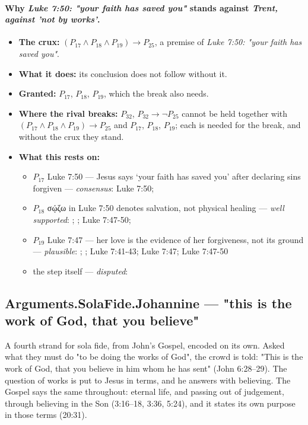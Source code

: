\documentclass[11pt]{article}
\begin{document}
\paragraph{Why \emph{Luke 7:50: "your faith has saved you"} stands against \emph{Trent, against 'not by works'}.}
\begin{itemize}
\item \textbf{The crux:} \((P_{17} \land P_{18} \land P_{19}) \rightarrow P_{25}\), a premise of \emph{Luke 7:50: "your faith has saved you"}.
\item \textbf{What it does:} its conclusion does not follow without it.
\item \textbf{Granted:} \(P_{17}\), \(P_{18}\), \(P_{19}\), which the break also needs.
\item \textbf{Where the rival breaks:} \(P_{32}\), \(P_{32} \rightarrow \lnot P_{25}\) cannot be held together with \((P_{17} \land P_{18} \land P_{19}) \rightarrow P_{25}\) and \(P_{17}\), \(P_{18}\), \(P_{19}\); each is needed for the break, and without the crux they stand.
\item \textbf{What this rests on:}
\begin{itemize}
\item \(P_{17}\) Luke 7:50 — Jesus says ‘your faith has saved you’ after declaring sins forgiven --- \emph{consensus}: Luke 7:50; \cite[ad loc. Luke 7:50]{marshall-luke-1978}
\item \(P_{18}\) σῴζω in Luke 7:50 denotes salvation, not physical healing --- \emph{well supported}: \cite[Apology IV, on love and the fulfilling of the law: Luke 7:47–50]{kolb-wengert-book-of-concord-2000}; \cite[54--55]{padilla-narrative-criticism-2021}; Luke 7:47-50; \cite[ad loc. Luke 7:50]{marshall-luke-1978}
\item \(P_{19}\) Luke 7:47 — her love is the evidence of her forgiveness, not its ground --- \emph{plausible}: \cite[54--54]{padilla-narrative-criticism-2021}; \cite[Apology IV, on love and the fulfilling of the law: Luke 7:47–50]{kolb-wengert-book-of-concord-2000}; Luke 7:41-43; Luke 7:47; Luke 7:47-50
\item the step itself --- \emph{disputed}: \cite[Trent, Session VI (1547), canon 9]{tanner-decrees-1990}
\end{itemize}
\end{itemize}
\subsection*{Arguments.SolaFide.Johannine — "this is the work of God, that you believe"}
A fourth strand for sola fide, from John's Gospel, encoded on its own. Asked what they must do "to be doing the works of God", the crowd is told: "This is the work of God, that you believe in him whom he has sent" (John 6:28–29). The question of works is put to Jesus in terms, and he answers with believing. The Gospel says the same throughout: eternal life, and passing out of judgement, through believing in the Son (3:16–18, 3:36, 5:24), and it states its own purpose in those terms (20:31).
\end{document}
